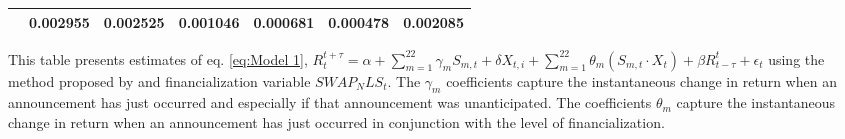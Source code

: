 \begin{sidewaystable}
{\begin{tabular}{@{}lllllllllllll@{}}
&\multicolumn{2}{c}{ 0.002955 }                                                 & \multicolumn{2}{c}{ 0.002525 }                                                 & \multicolumn{2}{c}{ 0.001046 }                                                 & \multicolumn{2}{c}{ 0.000681 }                                                 & \multicolumn{2}{c}{ 0.000478 }                                                   & \multicolumn{2}{c}{ 0.002085 }                                                 \\ \bottomrule 
\end{tabular}
}
\begin{tablenotes}\item 
    \singlespacing
    \footnotesize
    This table presents estimates of eq. \ref{eq:Model 1}, $R_{t}^{t+\tau}=\alpha+\sum_{m=1}^{22} \gamma_m S_{m,t}+ \delta X_{t,i} + \sum_{m=1}^{22} \theta_m (S_{m,t} \cdot X_t)+\beta R_{t-\tau}^{t}+\epsilon_{t}$ using the method proposed by \citet{kurov2019price} and financialization variable $SWAP_NLS_t$. The $\gamma_m$ coefficients capture the instantaneous change in return when an announcement has just occurred and especially if that announcement was unanticipated. The coefficients $\theta_m$ capture the instantaneous change in return when an announcement has just occurred in conjunction with the level of financialization.
\end{tablenotes}
\end{sidewaystable}

